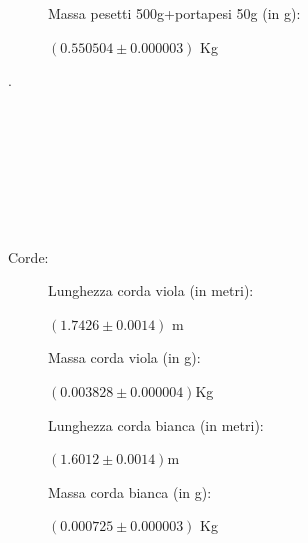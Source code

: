 \documentclass[a4paper]{article}
\theoremstyle{definition}
\begin{document}
\begin{figure}[!ht]
		\captionsetup{labelformat=empty}
	\caption{Massa pesetti 500g+portapesi 50g (in g):}
\caption{\( (0.550504 \pm 0.000003)\) Kg}
\end{figure}
.\\\\\\\\\\\\\\\\\\
Corde:
\begin{figure}[!ht]
		\captionsetup{labelformat=empty}
	\caption{Lunghezza corda viola (in metri):}
\caption{\( (1.7426 \pm 0.0014)\) m}
\end{figure}

\begin{figure}[!ht]
	\captionsetup{labelformat=empty}
	\caption{Massa corda viola (in g):}
\caption{\( (0.003828 \pm 0.000004) \)Kg}
\end{figure}


\begin{figure}[!ht]
	\captionsetup{labelformat=empty}
	\caption{Lunghezza corda bianca (in metri):}
\caption{\( (1.6012 \pm 0.0014 )\)m}
\end{figure}

\begin{figure}[!ht]
		\captionsetup{labelformat=empty}
\caption{Massa corda bianca (in g):}
\caption{\( (0.000725 \pm 0.000003 )\) Kg}
\end{figure}
\end{document}
